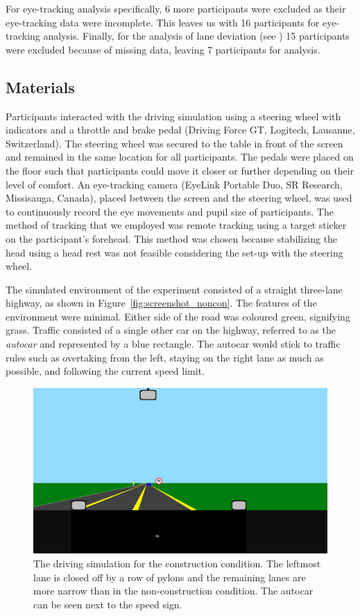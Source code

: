 For eye-tracking analysis specifically, 6 more participants were excluded as their eye-tracking data were incomplete. 
This leaves us with 16 participants for eye-tracking analysis.
Finally, for the analysis of lane deviation (see \citealp{Kelapanda2021}) 15 participants were excluded because of missing data, leaving 7 participants for analysis.

\subsection{Materials}
Participants interacted with the driving simulation using a steering wheel with indicators and a throttle and brake pedal (Driving Force GT, Logitech, Lausanne, Switzerland). 
The steering wheel was secured to the table in front of the screen and remained in the same location for all participants. 
The pedals were placed on the floor such that participants could move it closer or further depending on their level of comfort. 
An eye-tracking camera (EyeLink Portable Duo, SR Research, Missisauga, Canada), placed between the screen and the steering wheel, was used to continuously record the eye movements and pupil size of participants. 
The method of tracking that we employed was remote tracking using a target sticker on the participant's forehead.
This method was chosen because stabilizing the head using a head rest was not feasible considering the set-up with the steering wheel.

The simulated environment of the experiment consisted of a straight three-lane highway, as shown in Figure~\ref{fig:screenshot_noncon}.
The features of the environment were minimal. 
Either side of the road was coloured green, signifying grass. 
Traffic consisted of a single other car on the highway, referred to as the \textit{autocar} and represented by a blue rectangle.
The autocar would stick to traffic rules such as overtaking from the left, staying on the right lane as much as possible, and following the current speed limit. 

\begin{figure}
  \centering
  \includegraphics[width=\textwidth]{images/screenshot_con.pdf}
  \caption{The driving simulation for the construction condition. 
  The leftmost lane is closed off by a row of pylons and the remaining lanes are more narrow than in the non-construction condition. 
  The autocar can be seen next to the speed sign.}
  \label{fig:screenshot_con}
\end{figure}

